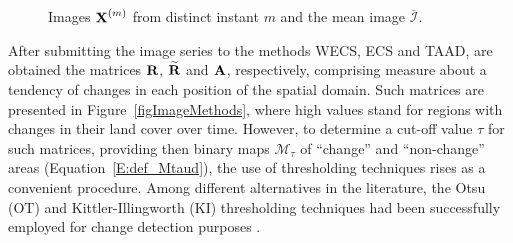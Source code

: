 \documentclass[journal]{IEEEtran}
\newcommand{\vA}{{\textbf A}}
\newcommand{\vR}{{\textbf R}}
\newcommand{\vX}{{\textbf X}}
\begin{document}
\begin{figure}[hbt]
\centering

\mbox{
}

\mbox{
}

\caption{Images $\vX^{(m)}$ from distinct instant $m$ and the mean image $\overline{\mathcal{I}}$.}
\label{F:forest_change_times}
\end{figure}



After submitting the image series to the methods WECS, ECS and TAAD, are obtained the matrices $\vR$, $\widetilde{\vR}$ and $\vA$, respectively, comprising measure about a tendency of changes in each position of the spatial domain. Such matrices are presented in Figure~\ref{figImageMethods}, where high values stand for regions with changes in their land cover over time.
%
However, to determine a cut-off value $\tau$ for such matrices, providing then binary maps $\mathcal{M}_{\tau}$ of ``change'' and ``non-change'' areas (Equation~\ref{E:def_Mtaud}), the use of thresholding techniques rises as a convenient procedure. 
Among different alternatives in the literature, the Otsu (OT) \cite{otsu1979threshold} and Kittler-Illingworth (KI) \cite{KittlerIllingworth1986} thresholding techniques had been successfully employed for change detection purposes \cite{JohnsonKasischke1998,Nielsen2007,WuEA2014,NegriEA2021}.
\end{document}
